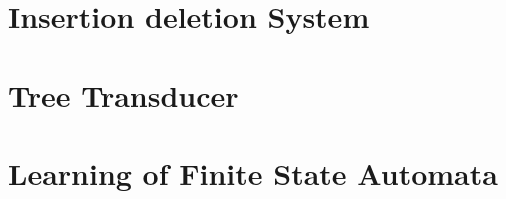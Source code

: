 \section{Insertion deletion System}

\section{Tree Transducer}



\section{Learning of Finite State Automata}


